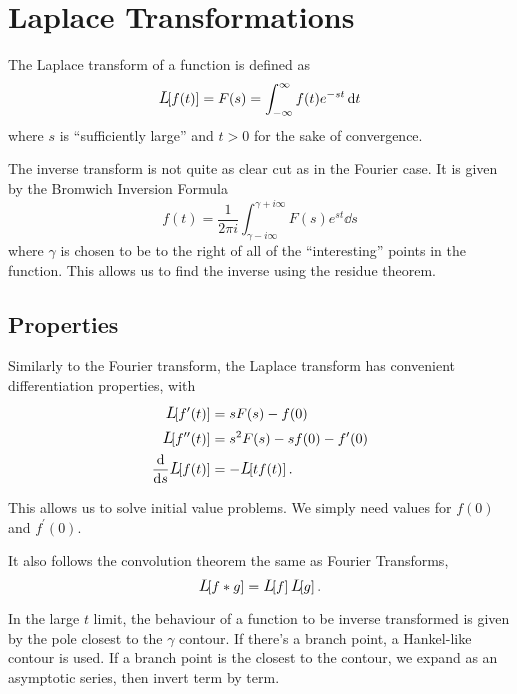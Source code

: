 \documentclass[a4paper,12pt,parskip=full,BCOR=1cm]{scrreprt}
\newcommand{\laplace}[1]{\ensuremath{\mathlarger{L}\!\!\left[#1 \right]}}
\begin{document}
\chapter{Laplace Transformations}
The Laplace transform of a function is defined as
$$\laplace{f(t)}=F(s)=\int_{-\infty}^\infty f(t)e^{-st}\dd{t}$$
where $s$ is ``sufficiently large'' and $t>0$ for the sake of convergence.

The inverse transform is not quite as clear cut as in the Fourier case.
It is given by the Bromwich Inversion Formula
\begin{equation*}
 f(t) = \frac{1}{2\pi i}\int_{\gamma-i\infty}^{\gamma+i\infty}F(s)e^{st}\dd{s}
\end{equation*} where $\gamma$ is chosen to be to the right of all of the ``interesting'' points in the function.
This allows us to find the inverse using the residue theorem.
\section{Properties}
Similarly to the Fourier transform, the Laplace transform has convenient differentiation properties, with \begin{align*}
 \laplace{f^{\prime}(t)}       & = sF(s) - f(0)                  \\
 \laplace{f^{\prime\prime}(t)} & = s^2F(s) - sf(0) - f^\prime(0) \\
 \dv{s}\laplace{f(t)}          & = -\laplace{tf(t)}.
\end{align*}

This allows us to solve initial value problems.
We simply need values for $f(0)$ and $f^\prime(0)$.

It also follows the convolution theorem the same as Fourier Transforms, $$\laplace{f*g}=\laplace{f}\laplace{g}.$$

In the large $t$ limit, the behaviour of a function to be inverse transformed is given by the pole closest to the $\gamma$ contour.
If there's a branch point, a Hankel-like contour is used.
If a branch point is the closest to the contour, we expand as an asymptotic series, then invert term by term.
\end{document}
